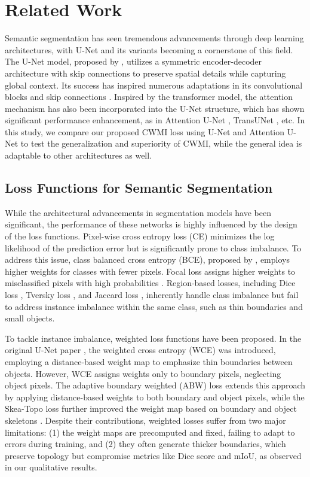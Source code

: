 \section{Related Work}
Semantic segmentation has seen tremendous advancements through deep learning architectures, with U-Net and its variants becoming a cornerstone of this field. The U-Net model, proposed by \cite{ronneberger2015u}, utilizes a symmetric encoder-decoder architecture with skip connections to preserve spatial details while capturing global context. Its success has inspired numerous adaptations in its convolutional blocks \cite{huang2019fixed,diakogiannis2020resunet} and skip connections \cite{zhou2018unet++,chen2021transunet}. Inspired by the transformer model, the attention mechanism has also been incorporated into the U-Net structure, which has shown significant performance enhancement, as in Attention U-Net \cite{islam2020brain}, TransUNet \cite{chen2021transunet}, etc. In this study, we compare our proposed CWMI loss using U-Net and Attention U-Net to test the generalization and superiority of CWMI, while the general idea is adaptable to other architectures as well. 

\subsection{Loss Functions for Semantic Segmentation}
While the architectural advancements in segmentation models have been significant, the performance of these networks is highly influenced by the design of the loss functions. Pixel-wise cross entropy loss (CE) minimizes the log likelihood of the prediction error but is significantly prone to class imbalance. To address this issue, class balanced cross entropy (BCE), proposed by \cite{long2015fully}, employs higher weights for classes with fewer pixels. Focal loss assigns higher weights to misclassified pixels with high probabilities \cite{ross2017focal}. Region-based losses, including Dice loss \cite{milletari2016v}, Tversky loss \cite{salehi2017tversky}, and Jaccard loss \cite{rahman2016optimizing}, inherently handle class imbalance but fail to address instance imbalance within the same class, such as thin boundaries and small objects.

To tackle instance imbalance, weighted loss functions have been proposed. In the original U-Net paper \cite{ronneberger2015u}, the weighted cross entropy (WCE) was introduced, employing a distance-based weight map to emphasize thin boundaries between objects. However, WCE assigns weights only to boundary pixels, neglecting object pixels. The adaptive boundary weighted (ABW) loss \cite{liu2022boundary} extends this approach by applying distance-based weights to both boundary and object pixels, while the Skea-Topo loss further improved the weight map based on boundary and object skeletons \cite{liu2024enhancing}. Despite their contributions, weighted losses suffer from two major limitations: (1) the weight maps are precomputed and fixed, failing to adapt to errors during training, and (2) they often generate thicker boundaries, which preserve topology but compromise metrics like Dice score and mIoU, as observed in our qualitative results.

